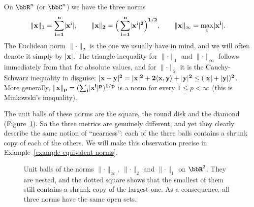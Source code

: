 \begin{example}\label{example lp norms}
    On $\bbR^n$ (or $\bbC^n$) we have the three norms
    \[\lVert \bf{x}\rVert_1=\sum_{i=1}^n\lvert x^i\rvert,\qquad \lVert \bf{x}\rVert_2=\Big(\sum_{i=1}^n\lvert x^i\rvert^2\Big)^{1/2},\qquad \lVert \bf{x}\rVert_\infty=\max_{i}\lvert x^i\rvert.\]
    The Euclidean norm $\lVert \cdot\rVert_2$ is the one we usually have in mind, and we will often denote it simply by $\lvert \bf{x}\rvert$. The triangle inequality for $\lVert \cdot\rVert_1$ and $\lVert \cdot\rVert_\infty$ follows immediately from that for absolute values, and for $\lVert \cdot\rVert_2$ it is the Cauchy-Schwarz inequality in disguise: $\lvert \bf{x}+\bf{y}\rvert^2=\lvert \bf{x}\rvert^2+2\langle \bf{x},\bf{y}\rangle+\lvert \bf{y}\rvert^2\leq(\lvert \bf{x}\rvert+\lvert \bf{y}\rvert)^2$. More generally, $\lVert \bf{x}\rVert_p=(\sum_i\lvert x^i\rvert^p)^{1/p}$ is a norm for every $1\leq p<\infty$ (this is Minkowski's inequality).

    The unit balls of these norms are the square, the round disk and the diamond (Figure~\ref{fig lp balls}). So the three metrics are genuinely different, and yet they clearly describe the same notion of ``nearness'': each of the three balls contains a shrunk copy of each of the others. We will make this observation precise in Example~\ref{example equivalent norms}.
\end{example}

\begin{figure}[tp]
    \centering
    \caption{Unit balls of the norms $\lVert\cdot\rVert_\infty$, $\lVert\cdot\rVert_2$ and $\lVert\cdot\rVert_1$ on $\bbR^2$. They are nested, and the dotted square shows that the smallest of them still contains a shrunk copy of the largest one. As a consequence, all three norms have the same open sets.}
    \label{fig lp balls}
\end{figure}

